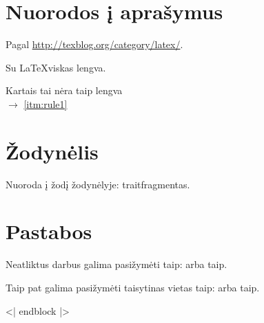 \section{Nuorodos į aprašymus}

Pagal \url{http://texblog.org/category/latex/}.

\begin{description}[style=multiline, labelwidth=2.0cm]
	\item[\namedlabel{itm:rule1}{1 taisyklė}] Su \LaTeX viskas lengva.
	\item[\namedlabel{itm:rule2}{2 taisyklė}] Kartais tai nėra taip lengva\\
		$\to$ \ref{itm:rule1}
\end{description}

\section{Žodynėlis}

Nuoroda į žodį žodynėlyje: \gls{trait}{fragmentas}.

\section{Pastabos}

Neatliktus darbus galima pasižymėti taip: 
arba taip.

Taip pat galima pasižymėti taisytinas vietas taip:  arba taip.



<| endblock |>
